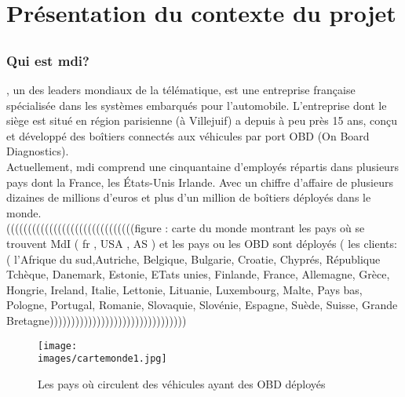 \section{Présentation du contexte du projet}
    \subsection{\company{}}
        \subsubsection{Qui est \texorpdfstring{\gls{mdi}}{MDI}?}
            \company{}\cite{mdi_site}, un des leaders mondiaux de la télématique, est une entreprise
            française spécialisée dans les systèmes embarqués pour l'automobile.
            L’entreprise dont le siège est situé en région parisienne (à Villejuif) a depuis à peu près
            15 ans, conçu et développé des boîtiers connectés aux véhicules par port OBD (On
            Board Diagnostics).\\
            Actuellement, \gls{mdi} comprend une cinquantaine d’employés répartis dans plusieurs
            pays dont la France, les États-Unis  Irlande. Avec un chiffre d’affaire de
            plusieurs dizaines de millions d’euros et plus d’un million de boîtiers déployés dans le
            monde.\\


            ((((((((((((((((((((((((((((((figure : carte du monde montrant les pays où se trouvent MdI ( fr , USA , AS ) et les 
            pays ou les OBD sont déployés ( les clients:  ( l’Afrique du sud,Autriche, Belgique, Bulgarie, Croatie, Chyprés, République Tchèque, Danemark, Estonie, ETats unies, Finlande, France, Allemagne, Grèce, Hongrie, Ireland, Italie, Lettonie, Lituanie, Luxembourg, Malte, Pays bas, Pologne, Portugal, Romanie, Slovaquie, Slovénie, Espagne, Suède, Suisse, Grande Bretagne))))))))))))))))))))))))))))))))
            \begin{figure}[ht]
                \centering
                \texttt{[image: \\images/cartemonde1.jpg]}
                \caption{Les pays où circulent des véhicules ayant des OBD déployés }
            \end{figure}


